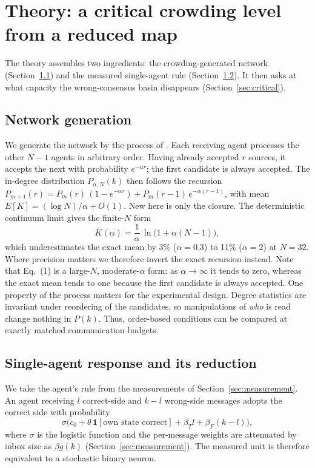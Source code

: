 \documentclass[11pt]{article}
\begin{document}
\section{Theory: a critical crowding level from a reduced map}\label{sec:theory}

The theory assembles two ingredients: the crowding-generated network
(Section~\ref{sec:netgen}) and the measured single-agent rule
(Section~\ref{sec:reduction}). It then asks at what capacity the
wrong-consensus basin disappears (Section~\ref{sec:critical}).

\subsection{Network generation}\label{sec:netgen}

We generate the network by the process of \citet{SciRepCrowding}. Each
receiving agent processes the other $N-1$ agents in arbitrary order. Having
already accepted $r$ sources, it accepts the next with probability
$e^{-\alpha r}$; the first candidate is always accepted. The in-degree
distribution $P_{\alpha,N}(k)$ then follows the recursion
$P_{m+1}(r) = P_m(r)\,(1-e^{-\alpha r}) + P_m(r-1)\,e^{-\alpha (r-1)}$,
with mean $E[K] = (\log N)/\alpha + O(1)$. New here is only the closure.
The deterministic continuum limit gives the finite-$N$ form
\begin{equation}
\bar K(\alpha) = \frac{1}{\alpha}\,\ln\!\bigl(1 + \alpha (N-1)\bigr),
\end{equation}
which underestimates the exact mean by 3\% ($\alpha = 0.3$) to 11\%
($\alpha = 2$) at $N = 32$. Where precision matters we therefore invert the
exact recursion instead. Note that Eq.~(1) is a large-$N$,
moderate-$\alpha$ form: as $\alpha \to \infty$ it tends to zero, whereas
the exact mean tends to one because the first candidate is always accepted.
One property of the process matters for the experimental design. Degree
statistics are invariant under reordering of the candidates, so
manipulations of \emph{who} is read change nothing in $P(k)$. Thus,
order-based conditions can be compared at exactly matched communication
budgets.

\subsection{Single-agent response and its reduction}\label{sec:reduction}

We take the agent's rule from the measurements of
Section~\ref{sec:measurement}. An agent receiving $l$ correct-side and
$k-l$ wrong-side messages adopts the correct side with probability
\[
\sigma\bigl(c_0 + \theta\,\mathbf{1}[\text{own state correct}] + \beta_T l +
\beta_F (k-l)\bigr),
\]
where $\sigma$ is the logistic function and the
per-message weights are attenuated by inbox size as $\beta g(k)$
(Section~\ref{sec:measurement}). The measured unit is therefore equivalent
to a stochastic binary neuron.
\end{document}
